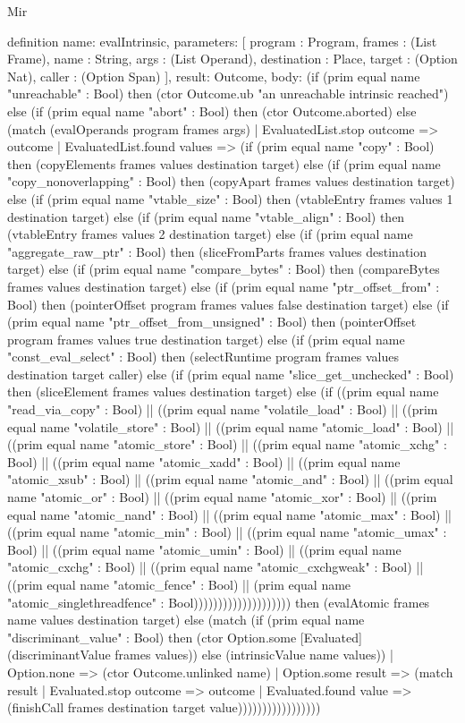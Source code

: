 \begin{lexlean}{Mir}
\begin{semanticmodule}
definition{
  name: evalIntrinsic,
  parameters: [
    program : Program,
    frames : (List Frame),
    name : String,
    args : (List Operand),
    destination : Place,
    target : (Option Nat),
    caller : (Option Span)
  ],
  result: Outcome,
  body: (if (prim equal name "unreachable" : Bool) then (ctor Outcome.ub "an unreachable intrinsic reached") else (if (prim equal name "abort" : Bool) then (ctor Outcome.aborted) else (match (evalOperands program frames args)
    | EvaluatedList.stop outcome => outcome
    | EvaluatedList.found values => (if (prim equal name "copy" : Bool) then (copyElements frames values destination target) else (if (prim equal name "copy_nonoverlapping" : Bool) then (copyApart frames values destination target) else (if (prim equal name "vtable_size" : Bool) then (vtableEntry frames values 1 destination target) else (if (prim equal name "vtable_align" : Bool) then (vtableEntry frames values 2 destination target) else (if (prim equal name "aggregate_raw_ptr" : Bool) then (sliceFromParts frames values destination target) else (if (prim equal name "compare_bytes" : Bool) then (compareBytes frames values destination target) else (if (prim equal name "ptr_offset_from" : Bool) then (pointerOffset program frames values false destination target) else (if (prim equal name "ptr_offset_from_unsigned" : Bool) then (pointerOffset program frames values true destination target) else (if (prim equal name "const_eval_select" : Bool) then (selectRuntime program frames values destination target caller) else (if (prim equal name "slice_get_unchecked" : Bool) then (sliceElement frames values destination target) else (if ((prim equal name "read_via_copy" : Bool) || ((prim equal name "volatile_load" : Bool) || ((prim equal name "volatile_store" : Bool) || ((prim equal name "atomic_load" : Bool) || ((prim equal name "atomic_store" : Bool) || ((prim equal name "atomic_xchg" : Bool) || ((prim equal name "atomic_xadd" : Bool) || ((prim equal name "atomic_xsub" : Bool) || ((prim equal name "atomic_and" : Bool) || ((prim equal name "atomic_or" : Bool) || ((prim equal name "atomic_xor" : Bool) || ((prim equal name "atomic_nand" : Bool) || ((prim equal name "atomic_max" : Bool) || ((prim equal name "atomic_min" : Bool) || ((prim equal name "atomic_umax" : Bool) || ((prim equal name "atomic_umin" : Bool) || ((prim equal name "atomic_cxchg" : Bool) || ((prim equal name "atomic_cxchgweak" : Bool) || ((prim equal name "atomic_fence" : Bool) || (prim equal name "atomic_singlethreadfence" : Bool)))))))))))))))))))) then (evalAtomic frames name values destination target) else (match (if (prim equal name "discriminant_value" : Bool) then (ctor Option.some [Evaluated] (discriminantValue frames values)) else (intrinsicValue name values))
      | Option.none => (ctor Outcome.unlinked name)
      | Option.some result => (match result
        | Evaluated.stop outcome => outcome
        | Evaluated.found value => (finishCall frames destination target value)))))))))))))))))
}


\end{semanticmodule}
\end{lexlean}

